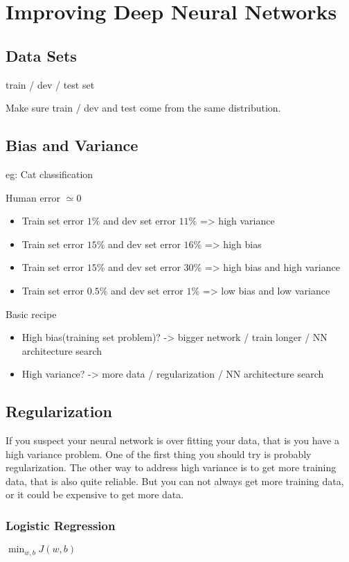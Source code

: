 \section{Improving Deep Neural Networks}

\subsection{Data Sets}
train / dev / test set

Make sure train / dev and test come from the same distribution.

\subsection{Bias and Variance}
eg: Cat classification

Human error $\simeq 0$
\begin{itemize}
\item Train set error $1\%$ and dev set error $11\%$ => high variance
\item Train set error $15\%$ and dev set error $16\%$ => high bias
\item Train set error $15\%$ and dev set error $30\%$ => high bias and high variance
\item Train set error $0.5\%$ and dev set error $1\%$ => low bias and low variance
\end{itemize}

Basic recipe
\begin{itemize}
\item High bias(training set problem)? -> bigger network / train longer / NN architecture search
\item High variance? -> more data / regularization / NN architecture search
\end{itemize}

\subsection{Regularization}
If you suspect your neural network is over fitting your data, that is you have a high variance problem.
One of the first thing you should try is probably regularization.
The other way to address high variance is to get more training data, that is also quite reliable.
But you can not always get more training data, or it could be expensive to get more data.

\subsubsection{Logistic Regression}
$\min_{w, b} J(w, b)$

